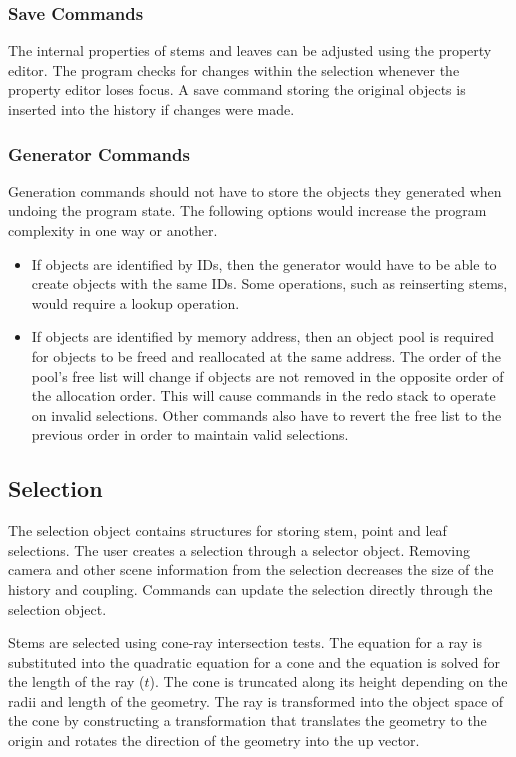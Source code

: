 \documentclass[10pt]{article}
\begin{document}
\subsubsection{Save Commands}
The internal properties of stems and leaves can be adjusted using the property editor. The program checks for changes within the selection whenever the property editor loses focus. A save command storing the original objects is inserted into the history if changes were made.

\subsubsection{Generator Commands}
Generation commands should not have to store the objects they generated when undoing the program state. The following options would increase the program complexity in one way or another.

\begin{itemize}
\item If objects are identified by IDs, then the generator would have to be able to create objects with the same IDs. Some operations, such as reinserting stems, would require a lookup operation.
\item If objects are identified by memory address, then an object pool is required for objects to be freed and reallocated at the same address. The order of the pool's free list will change if objects are not removed in the opposite order of the allocation order. This will cause commands in the redo stack to operate on invalid selections. Other commands also have to revert the free list to the previous order in order to maintain valid selections.
\end{itemize}

\subsection{Selection}
The selection object contains structures for storing stem, point and leaf selections. The user creates a selection through a selector object. Removing camera and other scene information from the selection decreases the size of the history and coupling. Commands can update the selection directly through the selection object.

Stems are selected using cone-ray intersection tests. The equation for a ray is substituted into the quadratic equation for a cone and the equation is solved for the length of the ray ($ t $). The cone is truncated along its height depending on the radii and length of the geometry. The ray is transformed into the object space of the cone by constructing a transformation that translates the geometry to the origin and rotates the direction of the geometry into the up vector.
\end{document}

